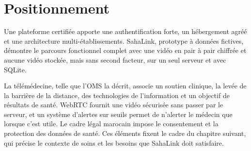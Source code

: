\section{Positionnement}

Une plateforme certifiée apporte une authentification forte, un hébergement agréé et une architecture multi-établissements. SahaLink, prototype à données fictives, démontre le parcours fonctionnel complet avec une vidéo en pair à pair chiffrée et aucune vidéo stockée, mais sans second facteur, sur un seul serveur et avec SQLite.

\conclchap

La télémédecine, telle que l'\ac{OMS} la décrit, associe un soutien clinique, la levée de la barrière de la distance, des technologies de l'information et un objectif de résultats de santé. WebRTC fournit une vidéo sécurisée sans passer par le serveur, et un système d'alertes sur seuils permet de n'alerter le médecin que lorsque c'est utile. Le cadre légal marocain impose le consentement et la protection des données de santé. Ces éléments fixent le cadre du chapitre suivant, qui précise le contexte de soins et les besoins que SahaLink doit satisfaire.

